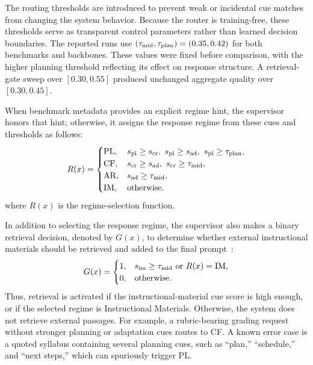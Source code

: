 \documentclass[letterpaper, 10 pt, conference]{ieeeconf}
\begin{document}
The routing thresholds are introduced to prevent weak or incidental cue matches from changing the system behavior. Because the router is training-free, these thresholds serve as transparent control parameters rather than learned decision boundaries. The reported runs use $(\tau_{\rm mid},\tau_{\rm plan})=(0.35,0.42)$ for both benchmarks and backbones. These values were fixed before comparison, with the higher planning threshold reflecting its effect on response structure. A retrieval-gate sweep over $[0.30,0.55]$ produced unchanged aggregate quality over $[0.30,0.45]$.

When benchmark metadata provides an explicit regime hint, the supervisor honors that hint; otherwise, it assigns the response regime from these cues and thresholds as follows:
\begin{equation}
R(x)=
\begin{cases}
\mathrm{PL}, & s_{\rm pl}\ge s_{\rm cr},\ s_{\rm pl}\ge s_{\rm ad},\ s_{\rm pl}\ge\tau_{\rm plan},\\
\mathrm{CF}, & s_{\rm cr}\ge s_{\rm ad},\ s_{\rm cr}\ge\tau_{\rm mid},\\
\mathrm{AR}, & s_{\rm ad}\ge \tau_{\rm mid},\\
\mathrm{IM}, & \mathrm{otherwise}.
\end{cases}
\end{equation}
where $R(x)$ is the regime-selection function.

In addition to selecting the response regime, the supervisor also makes a binary retrieval decision, denoted by $G(x)$, to determine whether external instructional materials should be retrieved and added to the final prompt~\cite{asai2024selfrag,jeong2024adaptiverag,wang2026targ}:
\begin{equation}
G(x)=
\begin{cases}
1, & s_{\rm im}\ge \tau_{\rm mid}\ \mathrm{or}\ R(x)=\mathrm{IM},\\
0, & \mathrm{otherwise}.
\end{cases}
\end{equation}
Thus, retrieval is activated if the instructional-material cue score is high enough, or if the selected regime is Instructional Materials. Otherwise, the system does not retrieve external passages. For example, a rubric-bearing grading request without stronger planning or adaptation cues routes to CF. A known error case is a quoted syllabus containing several planning cues, such as ``plan,'' ``schedule,'' and ``next steps,'' which can spuriously trigger PL.
\end{document}
